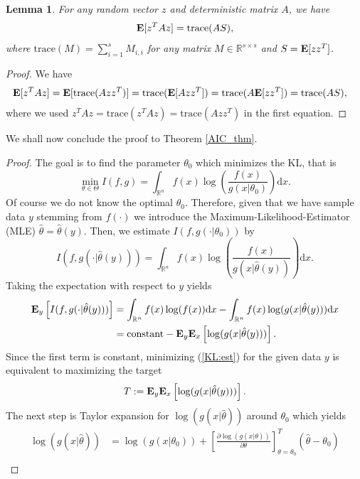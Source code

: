\documentclass[a4paper, 11pt]{scrreprt}
\newtheorem{Lemma}[Theorem]{Lemma}
\newcommand{\RR}{\mathbb{R}}
\newcommand{\trace}{{\mathrm{trace}}}
\newcommand{\ew}{\mbox{\textbf{E}}}
\begin{document}
\begin{Lemma}\label{aic:lemma4} \upshape
For any random vector $z$ and deterministic matrix $A$, we have
 \[	\ew[z^T A z] = \trace(A S), \]
 where $\trace(M) = \sum_{i=1}^{s} M_{i,i}$ for any matrix $M \in \RR^{s \times s}$
 and $S = \ew[zz^T]$.
\end{Lemma}
\begin{proof} We have
\begin{align*}
\ew[z^T A z] &= \ew[ \trace(A zz^T)] = \trace( \ew[ A zz^T ] ) 
= \trace( A \ew[ zz^T ] ) =  \trace(A S),
\end{align*}
where we used $z^T A z = \trace(z^T A z) = \trace(A zz^T)$ in the first equation.
\end{proof}

We shall now conclude the proof to Theorem \ref{AIC_thm}.
\begin{proof}
The goal is to find the parameter $\theta_0$ which minimizes the KL, that is
\begin{equation}
\min_{\theta\in\Theta} I(f,g) = \int_{\RR^n} f(x) \log\left( \frac{f(x)}{g(x|\theta_0)} \right)\mathrm{d}x.
\end{equation}
Of course we do not know the optimal $\theta_0$. Therefore, given that we have sample data $y$ stemming from $f(\cdot)$ we introduce the Maximum-Likelihood-Estimator (MLE) $\hat{\theta} = \hat{\theta}(y)$.
Then, we estimate $I(f,g(\cdot|\theta_0))$ by
\begin{equation}\label{KL:est}
I(f,g(\cdot|\hat{\theta}(y))) = \int_{\RR^n} f(x) \log\left( \frac{f(x)}{g(x|\hat{\theta}(y))} \right)\mathrm{d}x.
\end{equation}
Taking the expectation with respect to $y$ yields
\begin{align*}
\ew_y\left[I(f,g(\cdot|\hat{\theta}(y)))\right] &= 
\int_{\RR^n} f(x) \log(f(x))\mathrm{d}x - \int_{\RR^n} f(x) \log(g(x|\hat{\theta}(y)))  \mathrm{d}x \\
&= \text{constant} - \ew_y \ew_x \left[ \log(g(x| \hat{\theta}(y))) \right].
\end{align*}
Since the first term is constant, minimizing (\ref{KL:est}) for the given data $y$ is equivalent to maximizing the target
\[ 
T := \ew_y \ew_x \left[ \log(g(x| \hat{\theta}(y))) \right].
\]
The next step is Taylor expansion for $\log(g(x|\hat{\theta}))$ around $\theta_0$ which yields
\begin{align*}
\log(g(x|\hat{\theta})) 
&= \log(g(x|\theta_0)) +  \left[ \frac{\partial \log(g(x|\theta))}{\partial \theta} \right]_{\theta = \theta_0}^T  (\hat{\theta} - \theta_0) \\

\end{align*}
\end{proof}
\end{document}

